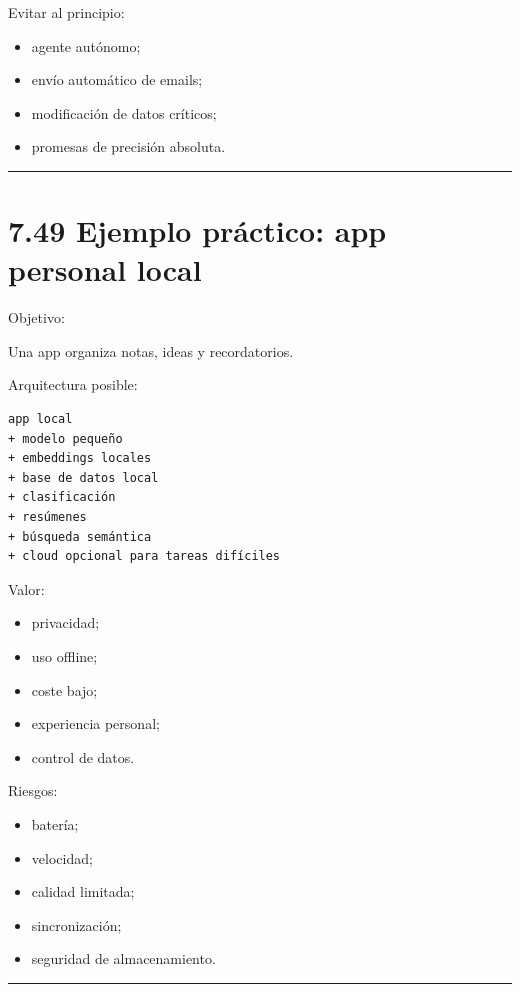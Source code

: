 Evitar al principio:

\begin{itemize}
\tightlist
\item
  agente autónomo;
\item
  envío automático de emails;
\item
  modificación de datos críticos;
\item
  promesas de precisión absoluta.
\end{itemize}

\begin{center}\rule{0.5\linewidth}{0.5pt}\end{center}

\section{7.49 Ejemplo práctico: app personal
local}\label{ejemplo-pruxe1ctico-app-personal-local}

Objetivo:

Una app organiza notas, ideas y recordatorios.

Arquitectura posible:

\begin{lstlisting}
app local
+ modelo pequeño
+ embeddings locales
+ base de datos local
+ clasificación
+ resúmenes
+ búsqueda semántica
+ cloud opcional para tareas difíciles
\end{lstlisting}

Valor:

\begin{itemize}
\tightlist
\item
  privacidad;
\item
  uso offline;
\item
  coste bajo;
\item
  experiencia personal;
\item
  control de datos.
\end{itemize}

Riesgos:

\begin{itemize}
\tightlist
\item
  batería;
\item
  velocidad;
\item
  calidad limitada;
\item
  sincronización;
\item
  seguridad de almacenamiento.
\end{itemize}

\begin{center}\rule{0.5\linewidth}{0.5pt}\end{center}

